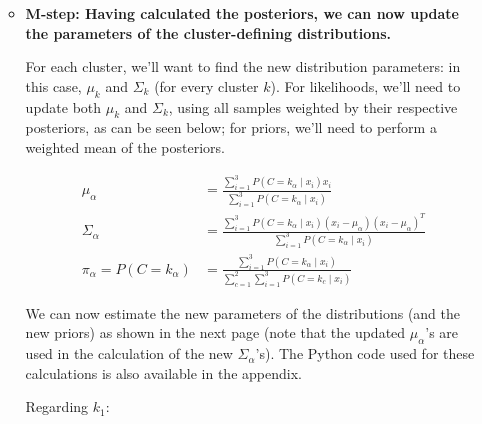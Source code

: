 \documentclass[12pt]{article}
\begin{document}
\begin{enumerate}[leftmargin=\labelsep]
\begin{itemize}[leftmargin=]
\begin{paracol}{2}
                \end{paracol}

          \item \textbf{M-step: Having calculated the posteriors, we can now
                  update the parameters of the cluster-defining distributions.}

                For each cluster, we'll want to find the new distribution parameters:
                in this case, $\mu_k$ and $\Sigma_k$ (for every cluster $k$).
                For likelihoods, we'll need to update both $\mu_k$ and $\Sigma_k$,
                using all samples weighted by their respective posteriors, as can be seen below;
                for priors, we'll need to perform a weighted mean of the posteriors.

                \begin{equation*}
                  \begin{aligned}
                    \mu_\alpha                   & = \frac{\sum_{i=1}^3 P(C = k_\alpha \mid x_i) x_i}{\sum_{i=1}^3 P(C = k_\alpha \mid x_i)}                                             \\
                    \Sigma_\alpha                & = \frac{\sum_{i=1}^3 P(C = k_\alpha \mid x_i) (x_{i} - \mu_{\alpha}) (x_{i} - \mu_{\alpha})^T}{\sum_{i=1}^3 P(C = k_\alpha \mid x_i)} \\
                    \pi_\alpha = P(C = k_\alpha) & = \frac{\sum_{i=1}^3 P(C = k_\alpha \mid x_i)}{\sum_{c=1}^2\sum_{i=1}^3 P(C = k_c \mid x_i)}
                  \end{aligned}
                \end{equation*}

                We can now estimate the new parameters of the distributions (and the new
                priors) as shown in the next page (note that the updated $\mu_\alpha$'s are used
                in the calculation of the new $\Sigma_\alpha$'s).
                The Python code used for these calculations is also
                available in the appendix.

                \pagebreak

                Regarding $k_1$:


\end{itemize}
\end{enumerate}
\end{document}
